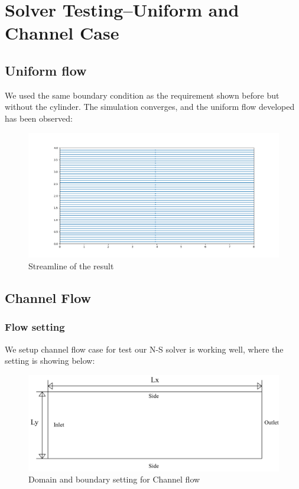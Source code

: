 \documentclass[12pt]{article}
\begin{document}
\newpage
\section{Solver Testing--Uniform and Channel Case}
\subsection{Uniform flow}

We used the same boundary condition as the requirement shown before but without the cylinder. The simulation converges, and the uniform flow developed has been observed:

\begin{figure}[H]
    \centering
    \includegraphics[width=0.6\linewidth]{figure/Uniformflow.jpg}
    \caption{Streamline of the result}
\end{figure}









\subsection{Channel Flow}
\subsubsection{Flow setting}
We setup channel flow case for test our N-S solver is working well, where the setting is showing below:

\begin{figure}[H]
    \centering
    \includegraphics[width=0.6\linewidth]{figure/Solver and Stting/Channel_Setting.jpg}
    \caption{Domain and boundary setting for Channel flow}
\end{figure}
\end{document}
